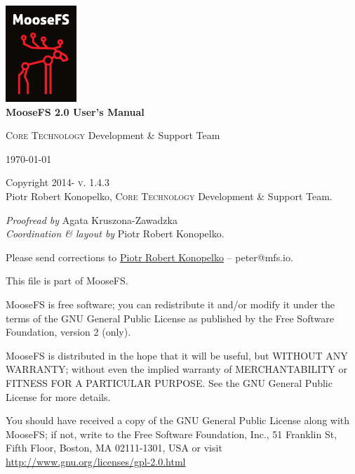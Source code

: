 \documentclass[a4paper,11pt,english]{report}
\newenvironment{copyrightnotice}
	{\begingroup
		\footnotesize
		\setlength{\parindent}{0pt}
		\setlength{\parskip}{\baselineskip}}
	{\endgroup}
\begin{document}
	
	\renewcommand{\labelitemi}{$\bullet$}
	\renewcommand{\labelitemii}{$\circ$}
	\renewcommand{\labelitemiii}{$\bullet$}
	\renewcommand{\labelitemiv}{$\circ$}
	
	\begin{titlepage}
		\begin{center}
			\includegraphics[width=0.2\textwidth]{images/moosefs.png}\\[1cm]
			
			{ \huge \bfseries MooseFS 2.0
			User's Manual \\[0.4cm] }
			

			\textsc{Core Technology} Development \& Support Team
			
			\vfill
			
			{\large \today}
		\end{center}
	\end{titlepage}
	
	
	\begin{copyrightnotice}
		\begin{flushleft}
			Copyright \textcopyright{} 2014-\the\year
			\hfill
			\textsc{v. 1.4.3}\\ %
			
			Piotr Robert Konopelko, \textsc{Core Technology} Development \& Support Team.
			
			\emph{Proofread by}
			Agata Kruszona-Zawadzka \\
			\emph{Coordination \& layout by} Piotr Robert Konopelko.
			
			Please send corrections to \href{mailto:peter@mfs.io}{Piotr Robert Konopelko} --  peter@mfs.io.
			
			\bigskip
			
			This file is part of MooseFS.
			
			MooseFS is free software; you can redistribute it and/or modify
			it under the terms of the GNU General Public License as published by
			the Free Software Foundation, version 2 (only).
			
			MooseFS is distributed in the hope that it will be useful,
			but WITHOUT ANY WARRANTY; without even the implied warranty of
			MERCHANTABILITY or FITNESS FOR A PARTICULAR PURPOSE. See the
			GNU General Public License for more details.
			
			You should have received a copy of the GNU General Public License
			along with MooseFS; if not, write to the Free Software
			Foundation, Inc., 51 Franklin St, Fifth Floor, Boston, MA 02111-1301, USA
			or visit \url{http://www.gnu.org/licenses/gpl-2.0.html}
		\end{flushleft}
	\end{copyrightnotice}
	
\end{document}

